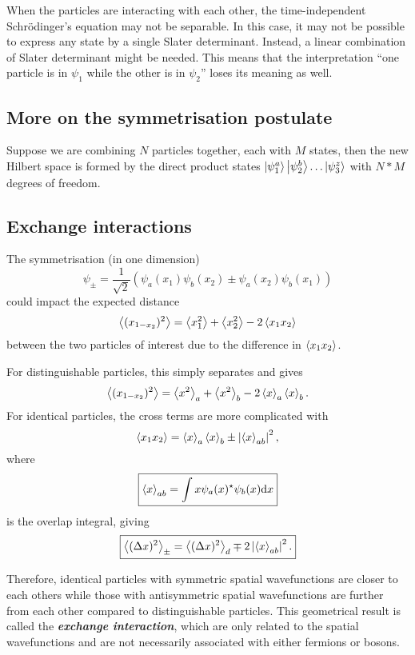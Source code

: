 \documentclass{article}
\theoremstyle{nonumberplain}
\begin{document}
When the particles are interacting with each other, the time-independent Schrödinger's equation may not be separable. In this case, it may not be possible to express any state by a single Slater determinant. Instead, a linear combination of Slater determinant might be needed. This means that the interpretation ``one particle is in $\psi_1$ while the other is in $\psi_2$'' loses its meaning as well. 
\subsection{More on the symmetrisation postulate}
Suppose we are combining $N$ particles together, each with $M$ states, then the new Hilbert space is formed by the direct product states $\ket{\psi_1^a} \ket{\psi_2^b} \ldots \ket{\psi_3^z}$ with $N*M$ degrees of freedom. 
\subsection{Exchange interactions}
The symmetrisation (in one dimension)
\[
    \psi_{\pm} = \frac{1}{\sqrt{2} } \left( 
        \psi_a(x_1) \psi_b(x_2) \pm \psi_a(x_2) \psi_b(x_1)
    \right)
\]
could impact the expected distance 
\[
    \expval{(x_{1-x_2} )^{2} } = \expval{x_1^2} + \expval{x_2^2} - 2 \expval{x_1 x_2} 
\]
between the two particles of interest due to the difference in $\expval{x_1 x_2}$. 

For distinguishable particles, this simply separates and gives 
\[
    \expval{(x_{1-x_2} )^{2} } = \expval{x^2}_a + \expval{x^2}_b - 2 \expval{x}_a \expval{x}_b.   
\]
For identical particles, the cross terms are more complicated with 
\[
    \expval{x_1 x_2} = \expval{x}_a \expval{x}_b \pm \left\vert \expval{x}_{ab} \right\vert ^{2},
\]
where 
\begin{equation}
    \label{eq:overlap-integral}
    \boxed{
    \expval{x}_{ab} = \int x \psi_a(x)^{\star} \psi_b(x) \mathrm{d} x}
\end{equation}
is the overlap integral, giving 
\[
    \boxed{ 
        \expval{(\Delta x)^{2} }_{\pm} = \expval{(\Delta x)^{2} }_d \mp 2 \left\vert \expval{x}_{ab} \right\vert ^{2}.
    }
\]

Therefore, identical particles with symmetric spatial wavefunctions are closer to each others while those with antisymmetric spatial wavefunctions are further from each other compared to distinguishable particles. This geometrical result is called the \textit{\textbf{exchange interaction}}, which are only related to the spatial wavefunctions and are not necessarily associated with either fermions or bosons. 
\end{document}
